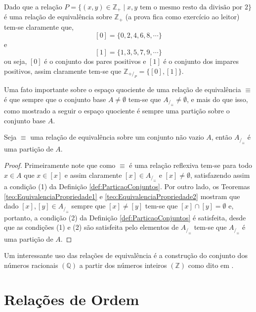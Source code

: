 \begin{example}
	Dado que a relação $P = \{(x,y) \in \mathbb{Z}_+ \mid x, y\text{ tem o mesmo resto da divisão por } 2\}$ é uma relação de equivalência sobre $\mathbb{Z}_+$ (a prova fica como exercício ao leitor) tem-se claramente que, 
	$$[0] = \{0, 2, 4, 6, 8, \cdots\}$$
	e
	$$[1] = \{1, 3, 5, 7, 9, \cdots\}$$
	ou seja, $[0]$ é o conjunto dos pares positivos e $[1]$ é o conjunto dos impares positivos, assim claramente tem-se que $\mathbb{Z}_{+/_P} = \{[0], [1]\}$.
\end{example}

Uma fato importante sobre o espaço quociente de uma relação de equivalência $\equiv$ é que sempre que o conjunto base $A \neq \emptyset$ tem-se que $A_{/_\equiv} \neq \emptyset$, e mais do que isso, como mostrado a seguir o espaço quociente é sempre uma partição sobre o conjunto base $A$.

\begin{theorem}
	Seja $\equiv$ uma relação de equivalência sobre um conjunto não vazio $A$, então $A_{/_\equiv}$ é uma partição de $A$.
\end{theorem}

\begin{proof}
	Primeiramente note que como $\equiv$ é uma relação reflexiva tem-se para todo $x \in A$ que $x \in [x]$ e assim claramente $[x] \in A_{/_\equiv}$ e $[x] \neq \emptyset$, satisfazendo assim a condição (1) da Definição \ref{def:ParticaoConjuntos}. Por outro lado, os Teoremas \ref{teo:EquivalenciaPropriedade1} e \ref{teo:EquivalenciaPropriedade2} mostram que dado $[x], [y] \in A_{/_\equiv}$ sempre que $[x] \neq [y]$ tem-se que  $[x] \cap [y] = \emptyset$ e, portanto, a condição (2) da Definição \ref{def:ParticaoConjuntos} é satisfeita, desde que as condições (1) e (2) são satisfeita pelo elementos de $A_{/_\equiv}$ tem-se que $A_{/_\equiv}$ é uma partição de $A$.
\end{proof}

Um interessante uso das relações de equivalência é a construção do conjunto dos números racionais $(\mathbb{Q})$ a partir dos números inteiros $(\mathbb{Z})$ como dito em \cite{carmo2013}.


\section{Relações de Ordem}\label{sec:Ordem}

